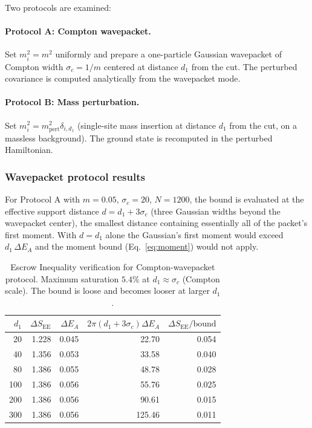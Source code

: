 \documentclass[11pt]{article}
\begin{document}
Two protocols are examined:

\paragraph{Protocol A: Compton wavepacket.} Set $m_i^2 = m^2$ uniformly and prepare a one-particle Gaussian wavepacket of Compton width $\sigma_c = 1/m$ centered at distance $d_1$ from the cut. The perturbed covariance is computed analytically from the wavepacket mode.

\paragraph{Protocol B: Mass perturbation.} Set $m_i^2 = m_{\mathrm{pert}}^2 \delta_{i,d_1}$ (single-site mass insertion at distance $d_1$ from the cut, on a massless background). The ground state is recomputed in the perturbed Hamiltonian.

\subsubsection{Wavepacket protocol results}

For Protocol A with $m = 0.05$, $\sigma_c = 20$, $N = 1200$, the bound is evaluated at the effective support distance $d = d_1 + 3\sigma_c$ (three Gaussian widths beyond the wavepacket center), the smallest distance containing essentially all of the packet's first moment. With $d = d_1$ alone the Gaussian's first moment would exceed $d_1\,\Delta E_A$ and the moment bound (Eq.~\ref{eq:moment}) would not apply.

\begin{table}[h]
\centering
\begin{tabular}{rrrrr}
\toprule
$d_1$ & $\Delta S_{\mathrm{EE}}$ & $\Delta E_A$ & $2\pi (d_1+3\sigma_c) \Delta E_A$ & $\Delta S_{\mathrm{EE}}/\mathrm{bound}$ \\
\midrule
20  & 1.228 & 0.045 & 22.70 & 0.054 \\
40  & 1.356 & 0.053 & 33.58 & 0.040 \\
80  & 1.386 & 0.055 & 48.78 & 0.028 \\
100 & 1.386 & 0.056 & 55.76 & 0.025 \\
200 & 1.386 & 0.056 & 90.61 & 0.015 \\
300 & 1.386 & 0.056 & 125.46 & 0.011 \\
\bottomrule
\end{tabular}
\caption{Escrow Inequality verification for Compton-wavepacket protocol. Maximum saturation $5.4\%$ at $d_1 \approx \sigma_c$ (Compton scale). The bound is loose and becomes looser at larger $d_1$.}
\label{tab:wavepacket}
\end{table}
\end{document}
